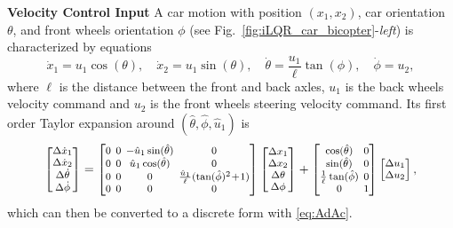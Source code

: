 \documentclass[10pt,a4paper]{article} %
\begin{document}
\noindent\textbf{Velocity Control Input} \newline
%
A car motion with position $(x_1,x_2)$, car orientation $\theta$, and front wheels orientation $\phi$ (see Fig.~\ref{fig:iLQR_car_bicopter}-\emph{left}) is characterized by equations
\begin{equation*}
	\dot{x}_1 = u_1 \cos(\theta),\quad
	\dot{x}_2 = u_1 \sin(\theta),\quad
	\dot{\theta} = \frac{u_1}{\ell} \tan(\phi),\quad
	\dot{\phi} = u_2,
\end{equation*}
where $\ell$ is the distance between the front and back axles, $u_1$ is the back wheels velocity command and $u_2$ is the front wheels steering velocity command. 
Its first order Taylor expansion around $(\hat{\theta}, \hat{\phi}, \hat{u}_1)$ is
\begin{equation}
	\setlength\arraycolsep{2pt}
	\footnotesize %
	\begin{bmatrix} \Delta\dot{x}_1 \\ \Delta\dot{x}_2 \\ \Delta\dot{\theta} \\ \Delta\dot{\phi} \end{bmatrix} =
	\begin{bmatrix} 0 & 0 & -\hat{u}_1\sin(\hat{\theta}) & 0 \\
					0 & 0 & \hat{u}_1\cos(\hat{\theta}) & 0 \\
					0 & 0 & 0 & \frac{\hat{u}_1}{\ell} (\tan(\hat{\phi})^2 \!+\! 1) \\
					0 & 0 & 0 & 0
	\end{bmatrix} 
	\begin{bmatrix} \Delta x_1 \\ \Delta x_2 \\ \Delta\theta \\ \Delta\phi \end{bmatrix} 
	+ 
	\setlength\arraycolsep{2pt}
	\footnotesize %
	\begin{bmatrix} \cos(\hat{\theta}) & 0 \\
					\sin(\hat{\theta}) & 0 \\
					\frac{1}{\ell} \tan(\hat{\phi}) & 0 \\
					0 & 1
	\end{bmatrix} 
	\begin{bmatrix} \Delta u_1 \\ \Delta u_2 \end{bmatrix},
\end{equation}
which can then be converted to a discrete form with \eqref{eq:AdAc}. \newline
\end{document}
